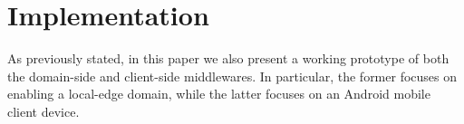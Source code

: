 \section{Implementation}\label{sec:implementation}

As previously stated, in this paper we also present a working prototype of both the domain-side and client-side middlewares. In particular, the former focuses on enabling a local-edge domain, while the latter focuses on an Android mobile client device.



